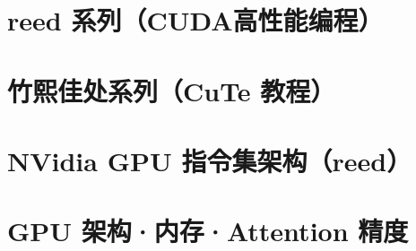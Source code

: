 \documentclass[9pt,openany]{ctexbook}
\begin{document}
\clearpage

\tableofcontents

\part{reed 系列（CUDA高性能编程）}















\part{竹熙佳处系列（CuTe 教程）}









\part{NVidia GPU 指令集架构（reed）}










\part{GPU 架构·内存·Attention 精度}





\end{document}
